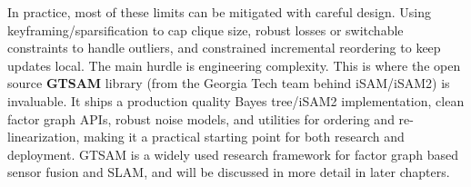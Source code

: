 In practice, most of these limits can be mitigated with careful design. Using keyframing/sparsification to cap clique size, robust losses or switchable constraints to handle outliers, and constrained incremental reordering to keep updates local. The main hurdle is engineering complexity. This is where the open source \textbf{GTSAM} library (from the Georgia Tech team behind iSAM/iSAM2) is invaluable. It ships a production quality Bayes tree/iSAM2 implementation, clean factor graph APIs, robust noise models, and utilities for ordering and re-linearization, making it a practical starting point for both research and deployment. GTSAM is a widely used research framework for factor graph based sensor fusion and SLAM, and will be discussed in more detail in later chapters.

